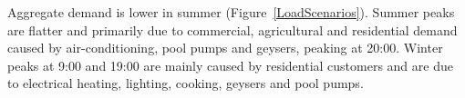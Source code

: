 

Aggregate demand is lower in summer (Figure~\ref{LoadScenarios}). Summer peaks are flatter and primarily due to commercial, agricultural and residential demand caused by air-conditioning, pool pumps and geysers, peaking at 20:00. Winter peaks at 9:00 and 19:00 are mainly caused by residential customers and are due to electrical heating, lighting, cooking, geysers and pool pumps.

